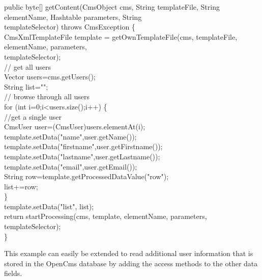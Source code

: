 \begin{java}
public byte[] getContent(CmsObject cms, String templateFile, String\\
\jtaba   elementName, Hashtable parameters, String\\
\jtaba   templateSelector) throws CmsException \{\\

CmsXmlTemplateFile template = getOwnTemplateFile(cms, templateFile,\\
\jtaba   elementName, parameters,\\
\jtaba   templateSelector);\\

\jtabc        // get all users\\
\jtabc        Vector users=cms.getUsers();\\

\jtabc        String list="";\\

\jtabc        // browse through all users\\
\jtabc        for (int i=0;i<users.size();i++) \{\\
\jtabd                //get a single user\\
\jtabd                CmsUser user=(CmsUser)users.elementAt(i);\\
\jtabd                template.setData("name",user.getName());\\
\jtabd                template.setData("firstname",user.getFirstname());\\
\jtabd                template.setData("lastname",user.getLastname());\\
\jtabd                template.setData("email",user.getEmail());\\
\jtabd                String row=template.getProcessedDataValue("row");\\
\jtabd                list+=row;\\
\jtabc        \}\\

\jtabc        template.setData("list", list);\\

\jtabc        return startProcessing(cms, template, elementName, parameters,\\
\jtabc            templateSelector);\\
\}\\
\end{java}

This example can easily be extended to read additional user information
that is stored in the OpenCms database by adding the access methods to
the other data fields.

